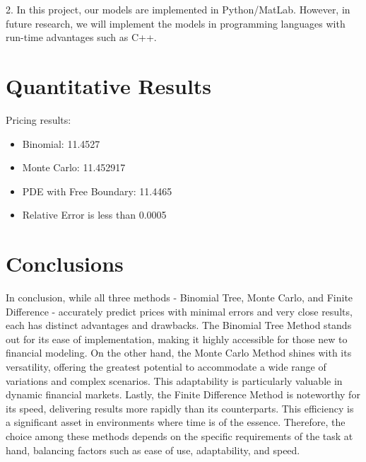 \documentclass{article}
\begin{document}
2. In this project, our models are implemented in Python/MatLab. However, in future research, we will implement the models in programming languages with run-time advantages such as C++.

\section{Quantitative Results}
Pricing results:
\begin{itemize}[label={}]
    \item Binomial: 11.4527 
    \item Monte Carlo: 11.452917
    \item PDE with Free Boundary: 11.4465
    \item Relative Error is less than 0.0005
\end{itemize}



\section{Conclusions}
In conclusion, while all three methods - Binomial Tree, Monte Carlo, and Finite Difference - accurately predict prices with minimal errors and very close results, each has distinct advantages and drawbacks. The Binomial Tree Method stands out for its ease of implementation, making it highly accessible for those new to financial modeling. On the other hand, the Monte Carlo Method shines with its versatility, offering the greatest potential to accommodate a wide range of variations and complex scenarios. This adaptability is particularly valuable in dynamic financial markets. Lastly, the Finite Difference Method is noteworthy for its speed, delivering results more rapidly than its counterparts. This efficiency is a significant asset in environments where time is of the essence. Therefore, the choice among these methods depends on the specific requirements of the task at hand, balancing factors such as ease of use, adaptability, and speed. 


\printbibliography
\end{document}
